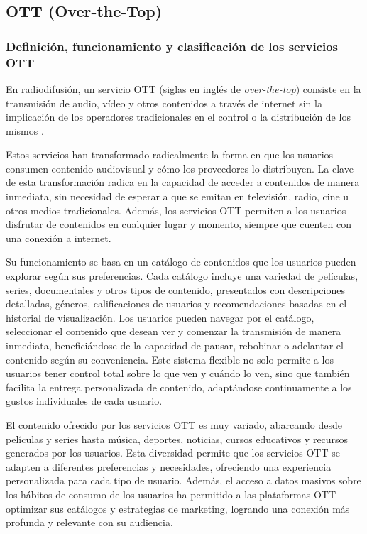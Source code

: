 \subsection{OTT (Over-the-Top)}
\label{sec:fundamentos_teoricos_ott}

\subsubsection{Definición, funcionamiento y clasificación de los servicios OTT}
\label{sec:ott_definicion_funcionamiento_clasificacion}

En radiodifusión, un servicio OTT (siglas en inglés de \textit{over-the-top}) consiste en la transmisión de audio, vídeo y otros 
contenidos a través de internet sin la implicación de los operadores tradicionales en el control o la distribución de los mismos \cite{OTT}.

Estos servicios han transformado radicalmente la forma en que los usuarios consumen contenido audiovisual y cómo los proveedores 
lo distribuyen. La clave de esta transformación radica en la capacidad de acceder a contenidos de manera inmediata, sin necesidad 
de esperar a que se emitan en televisión, radio, cine u otros medios tradicionales. Además, los servicios OTT permiten a los usuarios 
disfrutar de contenidos en cualquier lugar y momento, siempre que cuenten con una conexión a internet.

Su funcionamiento se basa en un catálogo de contenidos que los usuarios pueden explorar según sus preferencias. Cada catálogo 
incluye una variedad de películas, series, documentales y otros tipos de contenido, presentados con descripciones detalladas, 
géneros, calificaciones de usuarios y recomendaciones basadas en el historial de visualización. Los usuarios pueden navegar por 
el catálogo, seleccionar el contenido que desean ver y comenzar la transmisión de manera inmediata, beneficiándose de la capacidad 
de pausar, rebobinar o adelantar el contenido según su conveniencia. Este sistema flexible no solo permite a los usuarios tener control 
total sobre lo que ven y cuándo lo ven, sino que también facilita la entrega personalizada de contenido, adaptándose continuamente a los 
gustos individuales de cada usuario.

El contenido ofrecido por los servicios OTT es muy variado, abarcando desde películas y series hasta música, deportes, noticias, cursos 
educativos y recursos generados por los usuarios. Esta diversidad permite que los servicios OTT se adapten a diferentes preferencias y 
necesidades, ofreciendo una experiencia personalizada para cada tipo de usuario. Además, el acceso a datos masivos sobre los hábitos de 
consumo de los usuarios ha permitido a las plataformas OTT optimizar sus catálogos y estrategias de marketing, logrando una conexión más 
profunda y relevante con su audiencia.

